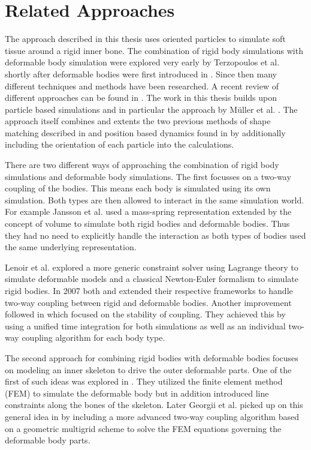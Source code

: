 \chapter{Related Approaches}
\label{cha:related_approaches}

The approach described in this thesis uses oriented particles to simulate soft tissue around a rigid inner bone. The combination of rigid body simulations with deformable body simulation were explored very early by Terzopoulos et al. \cite{Terzopoulos:1988bz} shortly after deformable bodies were first introduced in \cite{Terzopoulos:1987gf}. Since then many different techniques and methods have been researched. A recent review of different approaches can be found in \cite{Nealen:2006vp}. The work in this thesis builds upon particle based simulations and in particular the approach by M{\"u}ller et al. \cite{Muller:2011gn}. The approach itself combines and extents the two previous methods of shape matching described in \cite{Muller:2005fi} and position based dynamics found in \cite{Muller:2007vs} by additionally including the orientation of each particle into the calculations.

There are two different ways of approaching the combination of rigid body simulations and deformable body simulations. The first focusses on a two-way coupling of the bodies. This means each body is simulated using its own simulation. Both types are then allowed to interact in the same simulation world. For example Jansson et al. \cite{Jansson:2003cb} used a mass-spring representation extended by the concept of volume to simulate both rigid bodies and deformable bodies. Thus they had no need to explicitly handle the interaction as both types of bodies used the same underlying representation.

Lenoir et al. \cite{Lenoir:2004ic} explored a more generic constraint solver using Lagrange theory to simulate deformable models and a classical Newton-Euler formalism to simulate rigid bodies. In 2007 both \cite{Muller:2007vs} and \cite{Sifakis:2007to} extended their respective frameworks to handle two-way coupling between rigid and deformable bodies. Another improvement followed in \cite{Shinar:2008va} which focused on the stability of coupling. They achieved this by using a unified time integration for both simulations as well as an individual two-way coupling algorithm for each body type.

The second approach for combining rigid bodies with deformable bodies focuses on modeling an inner skeleton to drive the outer deformable parts. One of the first of such ideas was explored in \cite{Capell:2002ge}. They utilized the finite element method (FEM) to simulate the deformable body but in addition introduced line constraints along the bones of the skeleton. Later Georgii et al. picked up on this general idea in \cite{Georgii:2010tw} by including a more advanced two-way coupling algorithm based on a geometric multigrid scheme to solve the FEM equations governing the deformable body parts.

